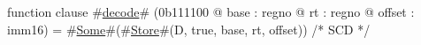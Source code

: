 function clause #\hyperref[zdecode]{decode}# (0b111100 @ base : regno @ rt : regno @ offset : imm16) =
  #\hyperref[zSome]{Some}#(#\hyperref[zStore]{Store}#(D, true, base, rt, offset))  /* SCD */
